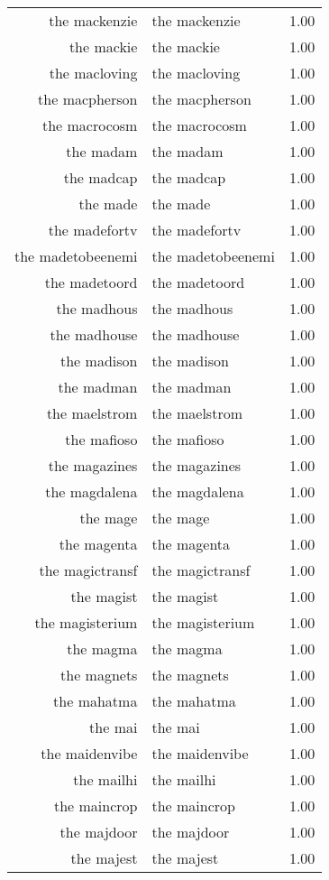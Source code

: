 \begin{table}[ht]
\begin{tabular}{rlr}
  the mackenzie & the mackenzie & 1.00 \\ 
  the mackie & the mackie & 1.00 \\ 
  the macloving & the macloving & 1.00 \\ 
  the macpherson & the macpherson & 1.00 \\ 
  the macrocosm & the macrocosm & 1.00 \\ 
  the madam & the madam & 1.00 \\ 
  the madcap & the madcap & 1.00 \\ 
  the made & the made & 1.00 \\ 
  the madefortv & the madefortv & 1.00 \\ 
  the madetobeenemi & the madetobeenemi & 1.00 \\ 
  the madetoord & the madetoord & 1.00 \\ 
  the madhous & the madhous & 1.00 \\ 
  the madhouse & the madhouse & 1.00 \\ 
  the madison & the madison & 1.00 \\ 
  the madman & the madman & 1.00 \\ 
  the maelstrom & the maelstrom & 1.00 \\ 
  the mafioso & the mafioso & 1.00 \\ 
  the magazines & the magazines & 1.00 \\ 
  the magdalena & the magdalena & 1.00 \\ 
  the mage & the mage & 1.00 \\ 
  the magenta & the magenta & 1.00 \\ 
  the magictransf & the magictransf & 1.00 \\ 
  the magist & the magist & 1.00 \\ 
  the magisterium & the magisterium & 1.00 \\ 
  the magma & the magma & 1.00 \\ 
  the magnets & the magnets & 1.00 \\ 
  the mahatma & the mahatma & 1.00 \\ 
  the mai & the mai & 1.00 \\ 
  the maidenvibe & the maidenvibe & 1.00 \\ 
  the mailhi & the mailhi & 1.00 \\ 
  the maincrop & the maincrop & 1.00 \\ 
  the majdoor & the majdoor & 1.00 \\ 
  the majest & the majest & 1.00 \\ 

\end{tabular}
\end{table}
